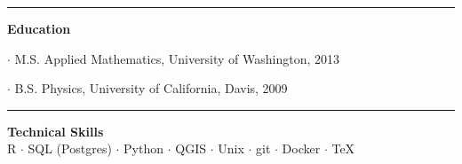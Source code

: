 \documentclass[letterpaper, onecolumn, oneside]{article}
\newcommand{\dotindent}{\hspace*{.25in}$\cdot$ }
\begin{document}
\begin{flushleft}
\textcolor{litegrey}{\rule{\textwidth}{.1pt}}

\vspace*{0.1in}
\textbf{\large Education}
\vspace*{0.05in}

\dotindent M.S. Applied Mathematics, University of Washington, 2013

\dotindent B.S. Physics, University of California, Davis, 2009

\textcolor{litegrey}{\rule{\textwidth}{.1pt}}

\end{flushleft}


\begin{centering}

{\bf Technical Skills} \\
R $\cdot$ SQL (Postgres)  $\cdot$ Python  $\cdot$ QGIS   $\cdot$  Unix   $\cdot$  git   $\cdot$ Docker $\cdot$  \TeX \\  

\end{centering}
\end{document}
